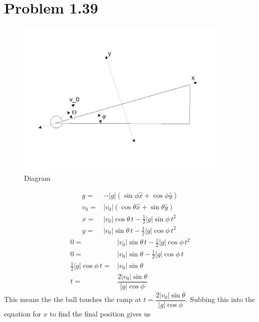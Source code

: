 \documentclass[12pt, a4paper]{article}
\begin{document}
\pagebreak
\section*{Problem 1.39}
\begin{figure}[h]
  \includegraphics[width=4in]{fig_1.pdf}
  \caption{Diagram}
  \label{fig_1}
\end{figure}
\begin{align*}
g =& -|g|(\sin\phi \hat{x}+\cos\phi \hat{y})
\\
v_0 =& |v_0|(\cos\theta\hat{x}+\sin\theta\hat{y})
\\
x =& |v_0|\cos\theta \,t - \tfrac{1}{2}|g|\sin\phi \,t^2
\\
y =& |v_0|\sin\theta \,t - \tfrac{1}{2}|g|\cos\phi \,t^2
\end{align*}
\begin{align*}
0 =& |v_0|\sin\theta \,t - \tfrac{1}{2}|g|\cos\phi \,t^2
\\
0 =& |v_0|\sin\theta  - \tfrac{1}{2}|g|\cos\phi \,t
\\
\tfrac{1}{2}|g|\cos\phi \,t =& |v_0|\sin\theta
\\
t =& \dfrac{2|v_0|\sin\theta}{|g|\cos\phi}
\end{align*}
This means the the ball touches the ramp at $t = \dfrac{2|v_0|\sin\theta}{|g|\cos\phi}$. Subbing this into the equation for $x$ to find the final position gives us
\end{document}
